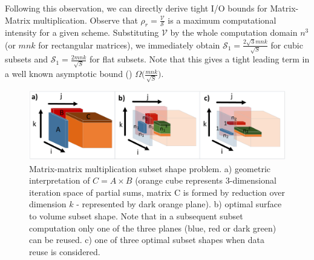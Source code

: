 \documentclass[sigconf]{acmart}
\begin{document}
Following this observation, we can directly derive tight I/O bounds for 
Matrix-Matrix multiplication. Observe that $\rho_r = 
\frac{\mathcal{V}}{\mathcal{S}}$ is a maximum computational intensity for a 
given scheme. Substituting $\mathcal{V}$ by the whole computation domain $n^3$ 
(or $mnk$ for rectangular matrices), we immediately obtain $\mathcal{S}_1 = 
\frac{2\sqrt{3}mnk}{\sqrt{S}}$ for cubic subsets and $\mathcal{S}_1 = 
\frac{2mnk}{\sqrt{S}}$ for flat subsets. Note that this gives a tight 
leading term in a well known asymptotic bound (\cite{redblue}) 
$\Omega\big(\frac{mnk}{\sqrt{S}}\big)$.

\begin{figure}
	\includegraphics[width=\columnwidth]{figures/mmm_reuse}
	\caption{Matrix-matrix multiplication subset shape problem. a) 
		geometric interpretation of $C = A \times B$ (orange cube represents 
		3-dimensional iteration space of partial sums, matrix C is formed by 
		reduction over dimension $k$ - represented by dark orange plane). b) 
		optimal surface to volume subset shape. Note that in a subsequent 
		subset computation only one of the three planes (blue, red or dark 
		green) can be reused. c) one of three optimal subset shapes when 
		data reuse is considered.}
	\label{fig:mmmreuse}
\end{figure}
\end{document}
